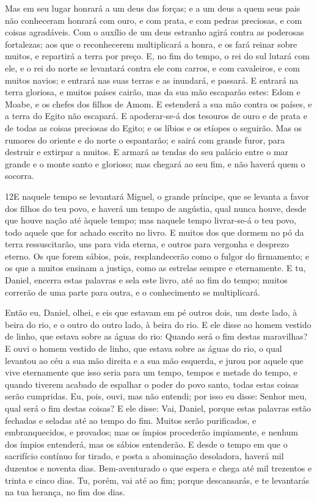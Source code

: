 Mas em seu lugar honrará a um deus das forças; e a um deus a
quem seus pais não conheceram honrará com ouro, e com prata, e com
pedras preciosas, e com coisas agradáveis. Com o auxílio de
um deus estranho agirá contra as poderosas fortalezas; aos que o
reconhecerem multiplicará a honra, e os fará reinar sobre muitos, e
repartirá a terra por preço. E, no fim do tempo, o rei do sul
lutará com ele, e o rei do norte se levantará contra ele com carros,
e com cavaleiros, e com muitos navios; e entrará nas suas terras e
as inundará, e passará. E entrará na terra gloriosa, e muitos
países cairão, mas da sua mão escaparão estes: Edom e Moabe, e os
chefes dos filhos de Amom. E estenderá a sua mão contra os
países, e a terra do Egito não escapará. E apoderar-se-á dos
tesouros de ouro e de prata e de todas as coisas preciosas do Egito;
e os líbios e os etíopes o seguirão. Mas os rumores do
oriente e do norte o espantarão; e sairá com grande furor, para
destruir e extirpar a muitos. E armará as tendas do seu
palácio entre o mar grande e o monte santo e glorioso; mas chegará
ao seu fim, e não haverá quem o socorra.

\medskip

\lettrine{12} E naquele tempo se levantará Miguel, o grande
príncipe, que se levanta a favor dos filhos do teu povo, e haverá um
tempo de angústia, qual nunca houve, desde que houve nação até
àquele tempo; mas naquele tempo livrar-se-á o teu povo, todo aquele
que for achado escrito no livro. E muitos dos que dormem no pó
da terra ressuscitarão, uns para vida eterna, e outros para vergonha
e desprezo eterno. Os que forem sábios, pois, resplandecerão
como o fulgor do firmamento; e os que a muitos ensinam a justiça,
como as estrelas sempre e eternamente. E tu, Daniel, encerra
estas palavras e sela este livro, até ao fim do tempo; muitos
correrão de uma parte para outra, e o conhecimento se multiplicará.

Então eu, Daniel, olhei, e eis que estavam em pé outros dois, um
deste lado, à beira do rio, e o outro do outro lado, à beira do rio.
E ele disse ao homem vestido de linho, que estava sobre as águas
do rio: Quando será o fim destas maravilhas? E ouvi o homem
vestido de linho, que estava sobre as águas do rio, o qual levantou
ao céu a sua mão direita e a sua mão esquerda, e jurou por aquele
que vive eternamente que isso seria para um tempo, tempos e metade
do tempo, e quando tiverem acabado de espalhar o poder do povo
santo, todas estas coisas serão cumpridas. Eu, pois, ouvi, mas
não entendi; por isso eu disse: Senhor meu, qual será o fim destas
coisas? E ele disse: Vai, Daniel, porque estas palavras estão
fechadas e seladas até ao tempo do fim. Muitos serão
purificados, e embranquecidos, e provados; mas os ímpios procederão
impiamente, e nenhum dos ímpios entenderá, mas os sábios entenderão.
E desde o tempo em que o sacrifício contínuo for tirado, e
posta a abominação desoladora, haverá mil duzentos e noventa dias.
Bem-aventurado o que espera e chega até mil trezentos e
trinta e cinco dias. Tu, porém, vai até ao fim; porque
descansarás, e te levantarás na tua herança, no fim dos dias.

